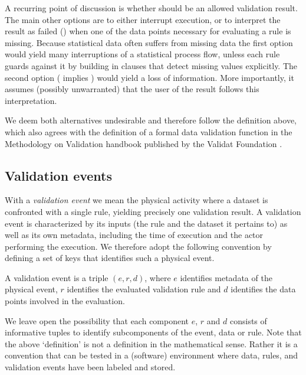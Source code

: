 A recurring point of discussion is whether \na{} should be an allowed
validation result. The main other options are to either interrupt execution, or
to interpret the result as failed (\onwaar{}) when one of the data points
necessary for evaluating a rule is missing. Because statistical data often
suffers from missing data the first option would yield many interruptions of a
statistical process flow, unless each rule guards against it by building in
clauses that detect missing values explicitly. The second option (\na{} implies
\onwaar{}) would yield a loss of information. More importantly, it assumes
(possibly unwarranted) that the user of the result follows this interpretation.

We deem both alternatives undesirable and therefore follow the definition
above, which also agrees with the definition of a formal data validation
function in the Methodology on Validation handbook published by the Validat
Foundation \cite{zio2015methodology}.

\subsection{Validation events}

With a \emph{validation event} we mean the physical activity where a dataset is
confronted with a single rule, yielding precisely one validation result. A
validation event is characterized by its inputs (the rule and the dataset it
pertains to) as well as its own metadata, including the time of execution and
the actor performing the execution. We therefore adopt the following convention
by defining a set of keys that identifies such a physical event.
%
\begin{definition} 
A validation event is a triple $(e,r,d)$, where $e$ identifies metadata of the
physical event, $r$ identifies the evaluated validation rule and $d$ identifies
the data points involved in the evaluation.
\label{def:validaitonevent}
\end{definition}
%
We leave open the possibility that each component $e$, $r$ and $d$ consists of
informative tuples to identify subcomponents of the event, data or rule.  Note
that the above `definition' is not a definition in the mathematical sense.
Rather it is a convention that can be tested in a (software) environment where
data, rules, and validation events have been labeled and stored.



